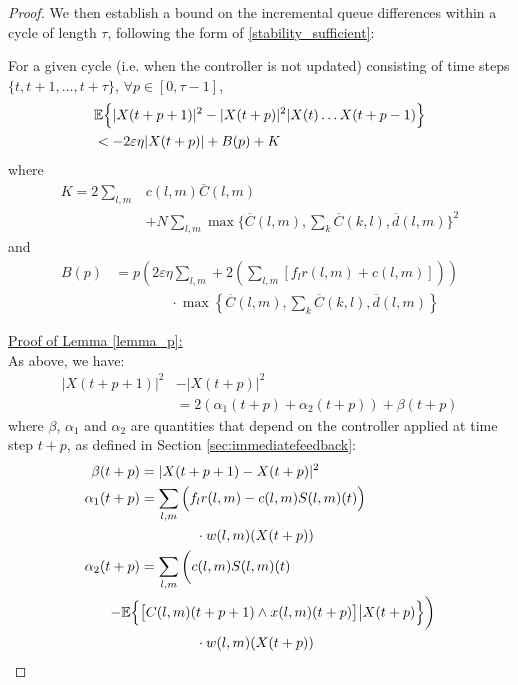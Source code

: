 \begin{proof}
We then establish a bound on the incremental queue differences within a cycle of length $\tau$, following the form of \eqref{stability_sufficient}: 
\begin{Lem} \label{lemma_p} 
For a given cycle (i.e. when the controller is not updated) consisting of time steps $\{t, t+1, \ldots,  t+\tau\}$,  $\forall p \in [0, \tau - 1 ]$, 
\begin{align} \nonumber 
&\expectation{\vert X(t + p + 1)\vert^2 - \vert X(t + p)\vert^2 \vert X(t) \ldots X(t + p - 1)} \\
&< -2\varepsilon \eta \vert X(t + p )\vert + B(p) + K \label{boundCycleMP}
\end{align}
where
\begin{align}  \label{Kdef}
K = 2 \sum_{l,m}&c(l,m)\overline{C}(l,m) \\ \nonumber 
& + N \sum_{l,m} \max\{ \overline{C}(l,m),\sum_{k}\overline{C}(k,l), \overline{d}(l,m) \} ^2
\end{align}
and
\begin{align} \nonumber 
B(p) &= p\left(2\varepsilon \eta  \sum_{l,m} + 2  (\sum_{l,m}[f_{l}r(l,m) + c(l,m)]) \right) \\
& \qquad \qquad \cdot \max\left\{ \overline{C}(l,m),\sum_{k}\overline{C}(k,l),\overline d(l,m) \right\} \label{Cpdef}
\end{align}
\end{Lem}
\underline{Proof of Lemma \ref{lemma_p}:} \\
As above, we have:
\begin{align} \label{immediate_to_bound} 
 |X(t+ p + 1)|^{2} &- |X(t + p)|^{2} \\  \nonumber
 & = 2(\alpha_1(t + p)+\alpha_2(t + p)) + \beta(t + p)   
\end{align}
where $\beta$, $\alpha_{1}$ and $\alpha_{2}$ are quantities that depend on the controller applied at time step $t + p$, as defined in Section \ref{sec:immediatefeedback}:
\begin{align*}
\beta (t+p)  &= \vert X(t + p + 1) - X(t + p) \vert^{2} \\
\alpha_{1} (t+p) &=  \sum_{l,m} \Big(f_{l}r(l,m) - c(l,m)S(l,m)(t)\Big)\\ 
& \qquad \qquad \cdot w(l,m)(X(t + p)) \\
 \alpha_{2}  (t+p)&= \sum_{l,m} \bigg(c(l,m)S(l,m)(t) \\ 
 - \expectation{ & \big[C(l,m)(t+p + 1)\wedge x(l,m)(t + p)\big] \big| X(t + p) }\bigg)\\
&\qquad \qquad \cdot w(l,m)(X(t + p))

\end{align*}
\end{proof}
